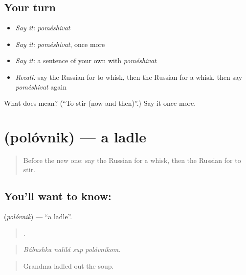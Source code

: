 \subsection*{Your turn}
\begin{itemize}
\raggedright
  \item \emph{Say it:} \emph{poméshivat}
  \item \emph{Say it:} \emph{poméshivat}, once more
  \item \emph{Say it:} a sentence of your own with \emph{poméshivat}
  \item \emph{Recall:} say the Russian for to whisk, then the Russian for a whisk, then say \emph{poméshivat} again
\end{itemize}

\begin{tcolorbox}[breakable,colback=teal!4,colframe=teal!35!black,title={Before you move on}]
What does  mean? (\textquotedblleft{}To stir (now and then)\textquotedblright{}.) Say it once more.
\end{tcolorbox}
\section[\texorpdfstring{\ru{половник} (polóvnik)}{половник (polóvnik)}]{ (polóvnik) — a ladle}

\label{lesson:RU-C330-polovnik}



\begin{quote}
Before the new one: say the Russian for a whisk, then the Russian for to stir.
\end{quote}

\subsection*{You'll want to know: }
\textbf{} (\emph{polóvnik}) — \textquotedblleft{}a ladle\textquotedblright{}.

\begin{quote}
   .
\end{quote}

\begin{quote}
\emph{Bábushka nalilá sup polóvnikom.}
\end{quote}

\begin{quote}
Grandma ladled out the soup.
\end{quote}

